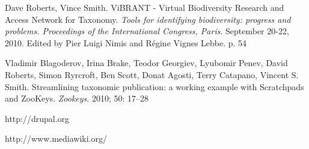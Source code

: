 \documentclass{article}
\begin{document}
\begin{thebibliography}{9}
 Dave Roberts, Vince Smith. ViBRANT - Virtual
  Biodiversity Research and Access Network for Taxonomy. {\em Tools
    for identifying biodiversity: progress and problems. Proceedings
    of the International Congress, Paris}. September 20-22,
  2010. Edited by Pier Luigi Nimis and Régine Vignes Lebbe. p. 54

 Vladimir Blagoderov, Irina Brake, Teodor Georgiev, Lyubomir
  Penev, David Roberts, Simon Ryrcroft, Ben Scott, Donat Agosti, Terry
  Catapano, Vincent S. Smith. Streamlining taxonomic publication: a
  working example with Scratchpads and ZooKeys. {\em Zookeys}. 2010;
  50: 17–28

 http://drupal.org

 http://www.mediawiki.org/

\end{thebibliography}
\end{document}
